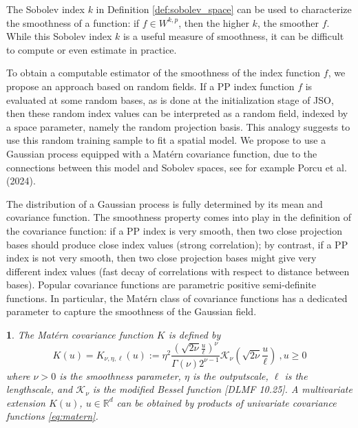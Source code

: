\documentclass[
  12pt,
]{interact}
\theoremstyle{plain}
\newtheorem{defn}{\protect\definitionname}
\providecommand{\definitionname}{Definition}
\begin{document}
The Sobolev index \(k\) in Definition \ref{def:sobolev_space} can be
used to characterize the smoothness of a function: if \(f\in W^{k,p}\),
then the higher \(k\), the smoother \(f\). While this Sobolev index
\(k\) is a useful measure of smoothness, it can be difficult to compute
or even estimate in practice.

To obtain a computable estimator of the smoothness of the index function
\(f\), we propose an approach based on random fields. If a PP index
function \(f\) is evaluated at some random bases, as is done at the
initialization stage of JSO, then these random index values can be
interpreted as a random field, indexed by a space parameter, namely the
random projection basis. This analogy suggests to use this random
training sample to fit a spatial model. We propose to use a Gaussian
process equipped with a Matérn covariance function, due to the
connections between this model and Sobolev spaces, see for example Porcu
et al. (2024).

The distribution of a Gaussian process is fully determined by its mean
and covariance function. The smoothness property comes into play in the
definition of the covariance function: if a PP index is very smooth,
then two close projection bases should produce close index values
(strong correlation); by contrast, if a PP index is not very smooth,
then two close projection bases might give very different index values
(fast decay of correlations with respect to distance between bases).
Popular covariance functions are parametric positive semi-definite
functions. In particular, the Matérn class of covariance functions has a
dedicated parameter to capture the smoothness of the Gaussian field.

\begin{defn}
The Matérn covariance function $K$ is defined by
\begin{equation}
K(u)=K_{\nu,\eta,\ell}(u):=\eta^2\frac{\left(\sqrt{2\nu}\frac{u}{\ell}\right)^{\nu}}{\Gamma(\nu)2^{\nu-1}}\mathcal{K}_{\nu}\left(\sqrt{2\nu}\frac{u}{\ell}\right)\ , u\geq0\label{eq:matern}
\end{equation}
where $\nu>0$ is the smoothness parameter, $\eta$ is the outputscale, $\ell$ is the lengthscale, and $\mathcal{K}_\nu$ is
the modified Bessel function [DLMF 10.25]. A multivariate extension $K(u)$, $u\in\mathbb{R}^d$ can be obtained by products of univariate covariance functions \eqref{eq:matern}.
\end{defn}
\end{document}
